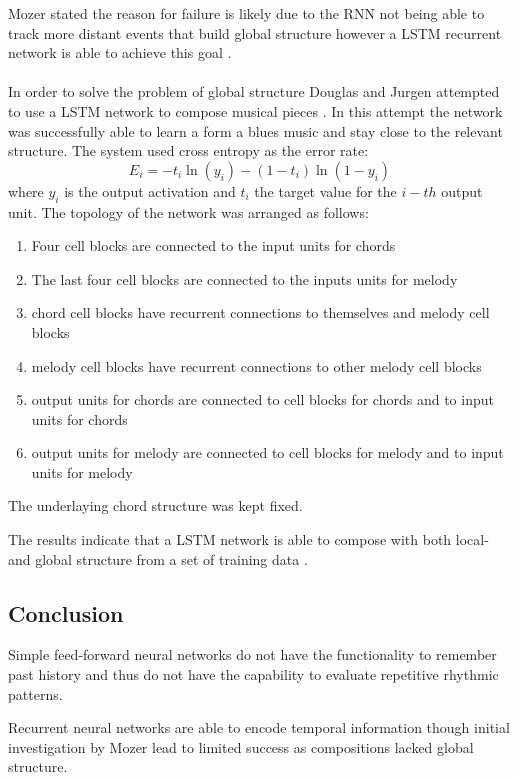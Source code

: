 Mozer stated the reason for failure is likely due to the \ac{RNN} not being able to track more distant events that build global structure \cite{mozer1994neural} however a \ac{LSTM} recurrent network is able to achieve this goal \cite{Eck2002}.
\\
\\
In order to solve the problem of global structure Douglas and Jurgen attempted to use a \ac{LSTM} network to compose musical pieces \cite{Eck2002}. In this attempt the network was successfully able to learn a form a blues music and stay close to the relevant structure.
The system used cross entropy as the error rate:
\[
E_i = -t_i \ln(y_i) - (1-t_i)\ln (1-y_i) \]
where $y_i$ is the output activation and $t_i$ the target value for the $i-th$ output unit.
The topology of the network was arranged as follows:
\begin{enumerate}
\item Four cell blocks are connected to the input units for chords
\item The last four cell blocks are connected to the inputs units for melody
\item chord cell blocks have recurrent connections to themselves and melody cell blocks
\item melody cell blocks have recurrent connections to other melody cell blocks
\item output units for chords are connected to cell blocks for chords and to input units for chords
\item output units for melody are connected to cell blocks for melody and to input units for melody
\end{enumerate}
The underlaying chord structure was kept fixed.

The results indicate that a \ac{LSTM} network is able to compose with both local- and global structure from a set of training data \cite{Eck2002}.


\subsection{Conclusion}

Simple feed-forward neural networks do not have the functionality to remember past history and thus do not have the capability to evaluate repetitive rhythmic patterns.

Recurrent neural networks are able to encode temporal information though initial investigation by Mozer lead to limited success as compositions lacked global structure. 

